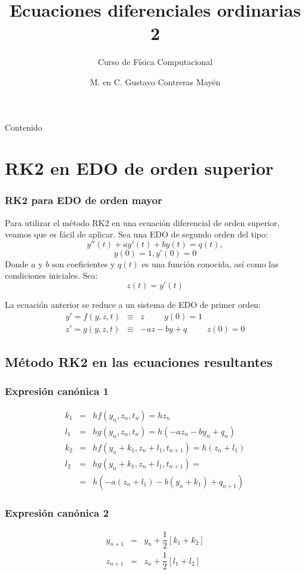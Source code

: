 

\usepackage{siunitx}
\usepackage[american,cuteinductors,smartlabels]{circuitikz}
\usetikzlibrary{calc}
\title{Ecuaciones diferenciales ordinarias 2}
\subtitle{Curso de F\'{i}sica Computacional}
\author{M. en C. Gustavo Contreras May\'{e}n}

\maketitle
\fontsize{14}{14}\selectfont
{}
\begin{frame}{Contenido}
\tableofcontents[pausesections]
\end{frame}
\section{RK2 en EDO de orden superior}
\begin{frame}
\frametitle{RK2 para EDO de orden mayor}
Para utilizar el m\'{e}todo RK2 en una ecuaci\'{o}n diferencial de orden superior, veamos que es f\'{a}cil de aplicar. Sea una EDO de segundo orden del tipo:
\[ y''(t) +ay'(t) + by(t) = q(t), \]
\[y(0)=1, y'(0)= 0 \]
Donde $a$ y $b$ son coeficientes y $q(t)$ es una funci\'{o}n conocida, as\'{i} como las condiciones iniciales. Sea:
\[z(t) = y'(t)\]
\end{frame}
\begin{frame}
La ecuaci\'{o}n anterior se reduce a un sistema de EDO de primer orden:
\begin{eqnarray*}
y' = f(y,z,t) & \equiv & z \hspace{1cm} y(0) = 1 \\
z' = g(y,z,t) & \equiv & - az - by + q \hspace{1cm} z(0) = 0
\end{eqnarray*}
\end{frame}
\subsection{M\'{e}todo RK2 en las ecuaciones resultantes}
\begin{frame}
\frametitle{Expresi\'{o}n can\'{o}nica 1}
\begin{eqnarray*}
	k_{1} & = & hf(y_{n}, z_{n}, t_{n}) = hz_{n} \\
	l_{1} & = & hg(y_{n}, z_{n}, t_{n}) = h(-az_{n} - by_{n} + q_{n}) \\
	k_{2} & = & hf(y_{n}+k_{1}, z_{n}+l_{1}, t_{n+1}) = h(z_{n}+l_{1}) \\
	l_{2} & = & hg(y_{n}+k_{1}, z_{n}+l_{1}, t_{n+1}) = \\
	& = & h(-a(z_{n}+l_{1}) - b(y_{n}+k_{1}) + q_{n+1})
\end{eqnarray*}
\end{frame}
\begin{frame}
\frametitle{Expresi\'{o}n can\'{o}nica 2}
\begin{eqnarray*}
	y_{n+1} & = & y_{n} + \dfrac{1}{2}[k_{1}+k_{2}] \\
	z_{n+1} & = & z_{n} + \dfrac{1}{2}[l_{1}+l_{2}]
\end{eqnarray*}
\end{frame}
